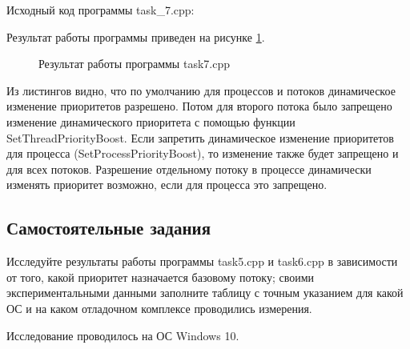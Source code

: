 \documentclass[a4paper]{article}
\begin{document}
	Исходный код программы task\_7.cpp:
	
	
	Результат работы программы приведен на рисунке \ref{img:task7}.
	\begin{figure}[h!]
		\caption{Результат работы программы task7.cpp}
		\label{img:task7}
	\end{figure}
	Из листингов видно, что по умолчанию для  процессов и потоков динамическое изменение приоритетов разрешено. Потом для второго потока было запрещено изменение динамического приоритета с помощью функции SetThreadPriorityBoost. Если запретить динамическое изменение приоритетов для процесса (SetProcessPriorityBoost), то изменение также будет запрещено и для всех потоков. Разрешение отдельному потоку в процессе динамически изменять приоритет возможно, если для процесса это запрещено.
	\subsection{Самостоятельные задания}
	Исследуйте результаты работы программы task5.cpp и task6.cpp в зависимости от того, какой приоритет назначается базовому потоку; своими экспериментальными данными заполните таблицу с точным указанием для какой ОС и на каком отладочном комплексе проводились измерения.
	
	Исследование проводилось на ОС Windows 10.
	
\end{document}
